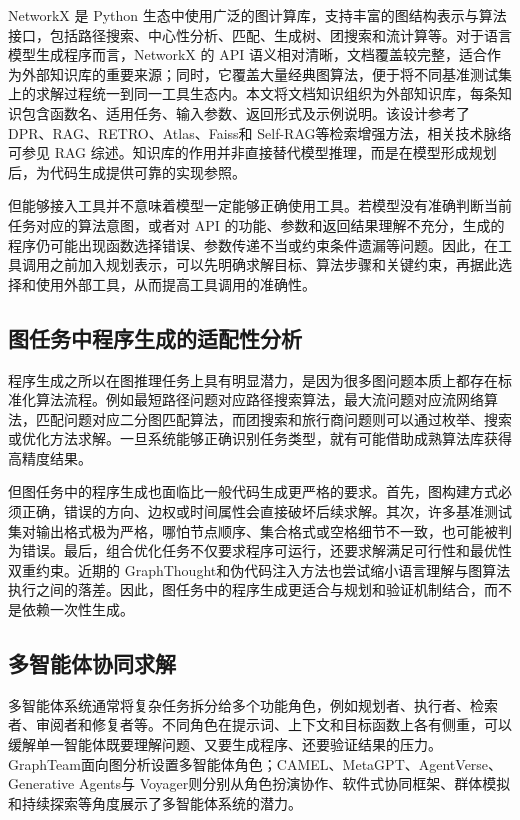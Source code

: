 NetworkX 是 Python 生态中使用广泛的图计算库，支持丰富的图结构表示与算法接口，包括路径搜索、中心性分析、匹配、生成树、团搜索和流计算等\cite{hagberg2008networkx}。对于语言模型生成程序而言，NetworkX 的 API 语义相对清晰，文档覆盖较完整，适合作为外部知识库的重要来源；同时，它覆盖大量经典图算法，便于将不同基准测试集上的求解过程统一到同一工具生态内。本文将文档知识组织为外部知识库，每条知识包含函数名、适用任务、输入参数、返回形式及示例说明。该设计参考了 DPR\cite{karpukhin2020dpr}、RAG\cite{lewis2020rag}、RETRO\cite{borgeaud2022retro}、Atlas\cite{izacard2023atlas}、Faiss\cite{johnson2019faiss}和 Self-RAG\cite{asai2024selfrag}等检索增强方法，相关技术脉络可参见 RAG 综述\cite{gao2024ragsurvey}。知识库的作用并非直接替代模型推理，而是在模型形成规划后，为代码生成提供可靠的实现参照。

但能够接入工具并不意味着模型一定能够正确使用工具。若模型没有准确判断当前任务对应的算法意图，或者对 API 的功能、参数和返回结果理解不充分，生成的程序仍可能出现函数选择错误、参数传递不当或约束条件遗漏等问题。因此，在工具调用之前加入规划表示，可以先明确求解目标、算法步骤和关键约束，再据此选择和使用外部工具，从而提高工具调用的准确性。

\subsection{图任务中程序生成的适配性分析}

程序生成之所以在图推理任务上具有明显潜力，是因为很多图问题本质上都存在标准化算法流程。例如最短路径问题对应路径搜索算法，最大流问题对应流网络算法，匹配问题对应二分图匹配算法，而团搜索和旅行商问题则可以通过枚举、搜索或优化方法求解。一旦系统能够正确识别任务类型，就有可能借助成熟算法库获得高精度结果。

但图任务中的程序生成也面临比一般代码生成更严格的要求。首先，图构建方式必须正确，错误的方向、边权或时间属性会直接破坏后续求解。其次，许多基准测试集对输出格式极为严格，哪怕节点顺序、集合格式或空格细节不一致，也可能被判为错误。最后，组合优化任务不仅要求程序可运行，还要求解满足可行性和最优性双重约束。近期的 GraphThought\cite{graphthought2025}和伪代码注入方法\cite{pseudocode2025}也尝试缩小语言理解与图算法执行之间的落差。因此，图任务中的程序生成更适合与规划和验证机制结合，而不是依赖一次性生成。

\subsection{多智能体协同求解}

多智能体系统通常将复杂任务拆分给多个功能角色，例如规划者、执行者、检索者、审阅者和修复者等。不同角色在提示词、上下文和目标函数上各有侧重，可以缓解单一智能体既要理解问题、又要生成程序、还要验证结果的压力。GraphTeam\cite{li2024graphteam}面向图分析设置多智能体角色；CAMEL\cite{camel2023}、MetaGPT\cite{metagpt2023}、AgentVerse\cite{agentverse2023}、Generative Agents\cite{park2023generativeagents}与 Voyager\cite{wang2023voyager}则分别从角色扮演协作、软件式协同框架、群体模拟和持续探索等角度展示了多智能体系统的潜力。

